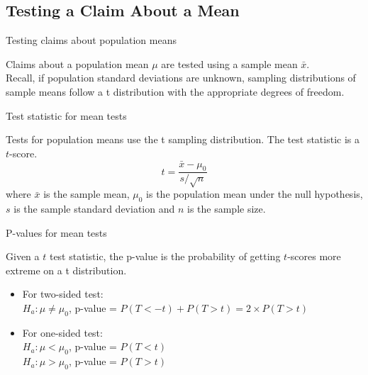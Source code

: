 \documentclass[xcolor=table, handout]{beamer}
\begin{document}
\subsection{Testing a Claim About a Mean}

\begin{frame}{Testing claims about population means}
\begin{block}{}
\large
Claims about a population mean $\mu$ are tested using a sample mean $\bar x$.\\
\medskip
Recall, if population standard deviations are unknown, sampling distributions of sample means follow a t distribution with the appropriate degrees of freedom.\\
\end{block}
\end{frame}

\begin{frame}{Test statistic for mean tests}
\begin{block}{}
\large
Tests for population means use the t sampling distribution. The test statistic is a $t$-score.
\[t = \frac {\bar x - \mu_0}{s/\sqrt{n}}\]
where $\bar x$ is the sample mean, $\mu_0$ is the population mean under the null hypothesis, $s$ is the sample standard deviation and $n$ is the sample size.
\end{block}

\end{frame}


\begin{frame}{P-values for mean tests}
\begin{block}{}
\large
Given a $t$ test statistic, the p-value is the probability of getting $t$-scores more extreme on a t distribution.
\begin{itemize}
\pause\item For two-sided test:\\ 
$H_a: \mu \ne \mu_0$, p-value = $P(T<-t) + P(T > t) = 2 \times P(T > t)$
\pause\item For one-sided test:\\
$H_a: \mu < \mu_0$, p-value = $P(T < t)$\\
$H_a: \mu > \mu_0$, p-value = $P(T > t)$
\end{itemize}
\end{block}
\end{frame}
\end{document}
